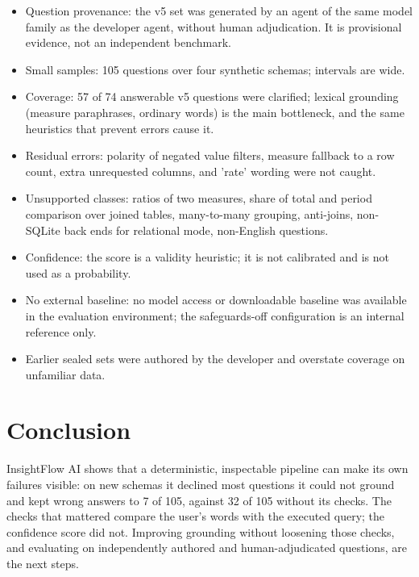 \documentclass[conference]{IEEEtran}
\begin{document}
\begin{itemize}\item Question provenance: the v5 set was generated by an agent of the same model family as the developer agent, without human adjudication. It is provisional evidence, not an independent benchmark.\item Small samples: 105 questions over four synthetic schemas; intervals are wide.\item Coverage: 57 of 74 answerable v5 questions were clarified; lexical grounding (measure paraphrases, ordinary words) is the main bottleneck, and the same heuristics that prevent errors cause it.\item Residual errors: polarity of negated value filters, measure fallback to a row count, extra unrequested columns, and 'rate' wording were not caught.\item Unsupported classes: ratios of two measures, share of total and period comparison over joined tables, many-to-many grouping, anti-joins, non-SQLite back ends for relational mode, non-English questions.\item Confidence: the score is a validity heuristic; it is not calibrated and is not used as a probability.\item No external baseline: no model access or downloadable baseline was available in the evaluation environment; the safeguards-off configuration is an internal reference only.\item Earlier sealed sets were authored by the developer and overstate coverage on unfamiliar data.\end{itemize}
\section{Conclusion}
InsightFlow AI shows that a deterministic, inspectable pipeline can make its own failures visible: on new schemas it declined most questions it could not ground and kept wrong answers to 7 of 105, against 32 of 105 without its checks. The checks that mattered compare the user's words with the executed query; the confidence score did not. Improving grounding without loosening those checks, and evaluating on independently authored and human-adjudicated questions, are the next steps.
\end{document}
